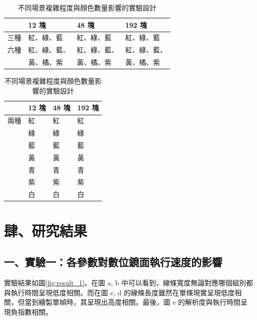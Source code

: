 \documentclass[12pt]{article}
\begin{document}
\begin{table}[h]
  \centering
  \caption{不同場景複雜程度與顏色數量影響的實驗設計}\label{table:sc3_des}
  \begin{tabular}{p{1cm}p{3cm}p{3cm}p{3cm}}
    \toprule
    & 12 塊 & 48 塊 & 192 塊 \\ 
    \midrule
    三種 & 紅、綠、藍 & 紅、綠、藍 & 紅、綠、藍 \\ 
    六種 & 紅、綠、藍、 & 紅、綠、藍、 & 紅、綠、藍、 \\ 
    & 黃、橘、紫 & 黃、橘、紫 & 黃、橘、紫 \\ 
    \bottomrule
  \end{tabular}
  \begin{tabular}{p{1cm}p{3cm}p{3cm}p{3cm}}
    \toprule
    & 12 塊 & 48 塊 & 192 塊 \\ 
    \midrule
    兩種 & 紅 & 紅 & 紅 \\ 
    & 綠 & 綠 & 綠 \\ 
    & 藍 & 藍 & 藍 \\ 
    & 黃 & 黃 & 黃 \\ 
    & 青 & 青 & 青 \\ 
    & 紫 & 紫 & 紫 \\ 
    & 白 & 白 & 白 \\ 
    \bottomrule
  \end{tabular}
\end{table}

\newpage

\section{肆、研究結果}

\subsection{一、實驗一：各參數對數位鏡面執行速度的影響}

實驗結果如圖\ref{fig:result_1}。在圖 a, b 中可以看到，線條寬度無論對應哪個組別都與執行時間呈現低度相關。而在圖 c, d 的線條長度雖然在單條現實呈現低度相關，但當到繪製單幀時，其呈現出高度相關。最後，圖 e 的解析度與執行時間呈現負指數相關。
\end{document}
